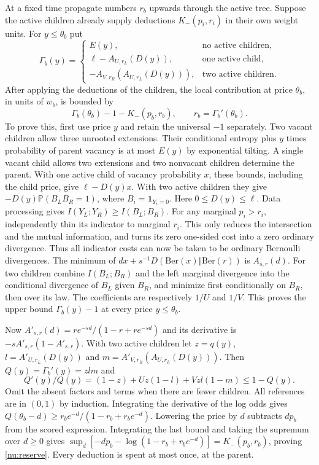 \documentclass[11pt]{article}
\numberwithin{equation}{section}
\newcommand{\PP}{\mathbb P}
\newcommand{\one}{\mathbf 1}
\begin{document}
At a fixed time propagate numbers $r_b$ upwards through the active
tree. Suppose the active children already supply deductions
$K_-(p_i,r_i)$ in their own weight units. For $y\le\theta_b$ put
\[
 \Gamma_b(y)=
 \begin{cases}
 E(y),&\text{no active children},\\
 \ell-A_{U,r_L}(D(y)),&\text{one active child},\\
 -A_{V,r_R}(A_{U,r_L}(D(y))),&\text{two active children}.
 \end{cases}
\]
After applying the deductions of the children, the local
contribution at price $\theta_b$, in units of $w_b$, is bounded by
\begin{equation}
  \Gamma_b(\theta_b)-1-K_-(p_b,r_b),
  \qquad r_b=\Gamma_b'(\theta_b).                           \label{nu:reserve}
\end{equation}
To prove this, first use price $y$ and retain the universal $-1$
separately. Two vacant children allow three unrooted extensions.
Their conditional entropy plus $y$ times probability of parent
vacancy is at most $E(y)$ by exponential tilting. A single vacant
child allows two extensions and two nonvacant children determine
the parent. With one active child of vacancy probability $x$,
these bounds, including the child price, give $\ell-D(y)x$.
With two active children they give $-D(y)\PP(B_L B_R=1)$, where
$B_i=\one_{Y_i=0}$. Here $0\le D(y)\le\ell$. Data processing
gives $I(Y_L;Y_R)\ge I(B_L;B_R)$. For any marginal $p_i>r_i$,
independently thin its indicator to marginal $r_i$. This only
reduces the intersection and the mutual information, and turns
its zero one-sided cost into a zero ordinary divergence.
Thus all indicator costs can now be taken to be ordinary
Bernoulli divergences. The minimum of $dx+s^{-1}D(\mathrm{Ber}(x)
\Vert\mathrm{Ber}(r))$ is $A_{s,r}(d)$. For two children combine
$I(B_L;B_R)$ and the left marginal divergence into the conditional
divergence of $B_L$ given $B_R$, and minimize first conditionally
on $B_R$, then over its law. The coefficients are respectively
$1/U$ and $1/V$. This proves the upper bound $\Gamma_b(y)-1$
at every price $y\le\theta_b$.

Now $A'_{s,r}(d)=re^{-sd}/(1-r+re^{-sd})$ and its derivative
is $-sA'_{s,r}(1-A'_{s,r})$. With two active children let
$z=q(y)$, $l=A'_{U,r_L}(D(y))$ and $m=A'_{V,r_R}(A_{U,r_L}(D(y)))$.
Then $Q(y)=\Gamma_b'(y)=zlm$ and
\[
 Q'(y)/Q(y)=(1-z)+Uz(1-l)+Vzl(1-m)\le1-Q(y).
\]
Omit the absent factors and terms when there are fewer children.
All references are in $(0,1)$ by induction. Integrating the
derivative of the log odds gives
$Q(\theta_b-d)\ge r_be^{-d}/(1-r_b+r_be^{-d})$.
Lowering the price by $d$ subtracts $dp_b$ from the scored
expression. Integrating the last bound and taking the supremum
over $d\ge0$ gives $\sup_d[-dp_b-\log(1-r_b+r_be^{-d})]
=K_-(p_b,r_b)$, proving \eqref{nu:reserve}. Every deduction is
spent at most once, at the parent.
\end{document}
